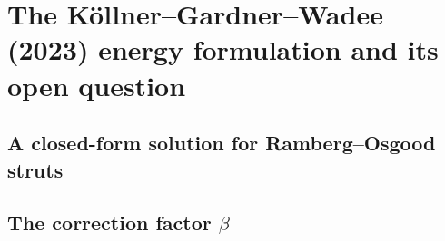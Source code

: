 
\section{The Köllner--Gardner--Wadee (2023) energy formulation and its open question}
\label{sec:kgw}

\subsection{A closed-form solution for Ramberg--Osgood struts}

\subsection{The correction factor $\beta$}
\label{sec:kgw-beta}

